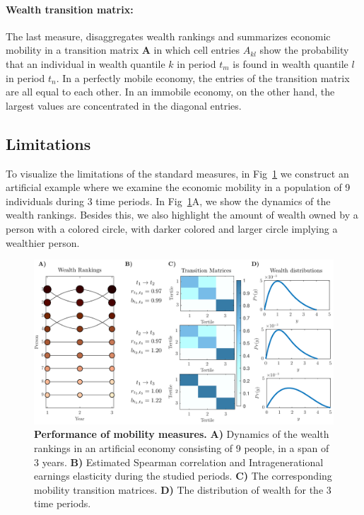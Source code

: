 \documentclass[11pt]{article}
\numberwithin{equation}{section}
\begin{document}
\paragraph{Wealth transition matrix:} The last measure, disaggregates wealth rankings and summarizes economic mobility in a
transition matrix $\mathbf{A}$ in which cell entries $A_{kl}$ show the probability that an individual in wealth quantile $k$ in period $t_m$ is found in wealth quantile $l$ in period $t_n$. In a perfectly mobile economy, the entries of the transition matrix are all equal to each other. In an immobile economy, on the other hand, the largest values are concentrated in the diagonal entries.

\subsection{Limitations}

To visualize the limitations of the standard measures, in Fig~\ref{fig:standard-mobility-measures} we construct an artificial example where we examine the economic mobility in a population of 9 individuals during 3 time periods. In Fig~\ref{fig:standard-mobility-measures}A, we show the dynamics of the wealth rankings. Besides this, we also highlight the amount of wealth owned by a person with a colored circle, with darker colored and larger circle implying a wealthier person. 
\begin{figure}[t!]
\includegraphics[width=\linewidth]{figs/fig_mobility_measures.pdf}
\caption{\textbf{Performance of mobility measures.} \textbf{A)} Dynamics of the wealth rankings in an artificial economy consisting of 9 people, in a span of 3 years. \textbf{B)} Estimated Spearman correlation and Intragenerational earnings elasticity during the studied periods. \textbf{C)} The corresponding mobility transition matrices. \textbf{D)} The distribution of wealth for the 3 time periods. \label{fig:standard-mobility-measures}}
\end{figure}
\end{document}
